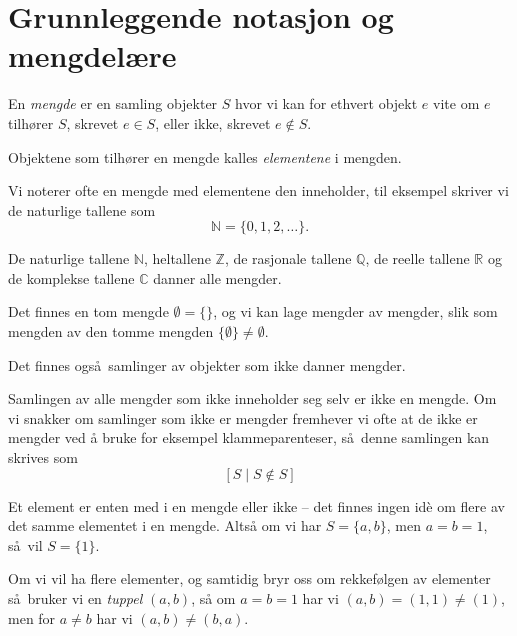 \section{Grunnleggende notasjon og mengdelære}

\begin{definition}
    En \textit{mengde} er en samling objekter $S$ hvor vi kan for
    ethvert objekt $e$ vite om $e$ tilhører $S$, skrevet $e\in S$,
    eller ikke, skrevet $e\notin S$.

    Objektene som tilhører en mengde kalles \textit{elementene}
    i mengden.
\end{definition}

Vi noterer ofte en mengde med elementene den inneholder,
til eksempel skriver vi de naturlige tallene som
\[
    \mathbb N = \{0, 1, 2, \dots\}.
\]
\begin{example}
    De naturlige tallene $\mathbb N$, heltallene $\mathbb Z$,
    de rasjonale tallene $\mathbb Q$,
    de reelle tallene $\mathbb R$
    og de komplekse tallene $\mathbb C$ danner alle mengder.

    Det finnes en tom mengde $\emptyset = \{\}$,
    og vi kan lage mengder av mengder,
    slik som mengden av den tomme mengden $\{\emptyset\}\neq\emptyset$.
\end{example}

Det finnes også samlinger av objekter som ikke danner mengder.
\begin{example}
    Samlingen av alle mengder som ikke inneholder seg selv er ikke en mengde.
    Om vi snakker om samlinger som ikke er mengder fremhever vi ofte at de ikke
    er mengder ved å bruke for eksempel klammeparenteser,
    så denne samlingen kan skrives som
    \[
        \left[
            S
            \mid
            S\notin S
        \right]
    \]
\end{example}

\begin{remark}
    Et element er enten med i en mengde eller ikke
    -- det finnes ingen id\`e om flere av det samme elementet i en mengde.
    Altså om vi har $S = \{a,b\}$, men $a = b = 1$,
    så vil $S = \{1\}$.

    Om vi vil ha flere elementer, og samtidig bryr oss om rekkefølgen av elementer
    så bruker vi en \textit{tuppel} $(a,b)$,
    så om $a = b = 1$ har vi $(a, b) = (1,1) \neq (1)$,
    men for $a\neq b$ har vi $(a, b)\neq (b, a)$.
\end{remark}

